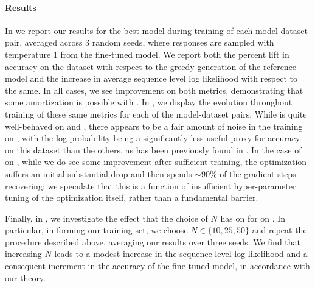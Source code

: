 {\paragraph{Results}  In  we report our results for the best model during training of each model-dataset pair, averaged across 3 random seeds, where responses are sampled with temperature 1 from the fine-tuned model.  We report both the percent lift in accuracy on the dataset with respect to the greedy generation of the reference model and the increase in average sequence level log likelihood with respect to the same.  In all cases, we see improvement on both metrics, demonstrating that some amortization is possible with \bestofnalg.  In , we display the evolution throughout training of these same metrics for each of the model-dataset pairs.  While \phithreefivemini is quite well-behaved on \mathdataset and \prontoqa, there appears to be a fair amount of noise in the training on \gsm, with the log probability being a significantly less useful proxy for accuracy on this dataset than the others, as has been previously found in \citet{block2023butterfly}.  In the case of \mistral on \mathdataset, while we do see some improvement after sufficient training, the optimization suffers an initial substantial drop and then spends $\sim90\% $ of the gradient steps recovering; we speculate that this is a function of insufficient hyper-parameter tuning of the optimization itself, rather than a fundamental barrier.

Finally, in , we investigate the effect that the choice of $N$ has on \bestofnalg for \phithreefivemini on \mathdataset.  In particular, in forming our training set, we choose $N \in \{10, 25, 50 \}$ and repeat the procedure described above, averaging our results over three seeds.  We find that increasing $N$ leads to a modest increase in the sequence-level log-likelihood and a consequent increment in the accuracy of the fine-tuned model, in accordance with our theory.
}



